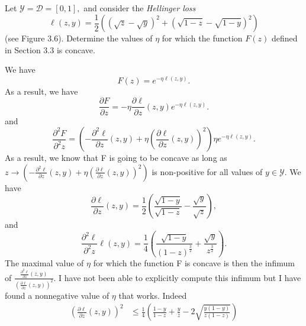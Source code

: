 \begin{exercise}[]{}
	Let $ \mathcal{Y} = \mathcal{D} = [0,1], $ and consider the \textit{Hellinger loss}
\begin{equation*}
	\ell(z,y) = \frac{1}{2} \left( (\sqrt{z}-\sqrt{y})^2 + (\sqrt{1-z}-\sqrt{1-y})^2 \right)
\end{equation*}
(see Figure 3.6). Determine the values of $ \eta $ for which the function $ F(z) $ defined in Section 3.3 is concave.
\end{exercise}

\begin{solution}[]
	We have 
\begin{equation*}
	F(z) = e^{-\eta\ell(z,y)}.
\end{equation*}
As a result, we have 
\begin{equation*}
	\frac{\partial F}{\partial z} = -\eta \frac{\partial \ell}{\partial z} (z,y) e^{-\eta \ell(z,y)}.
\end{equation*}
and
\begin{equation*}
	\frac{\partial ^2F}{\partial ^2z} = \left( -\frac{\partial ^2\ell}{\partial z} (z,y) + \eta \left(\frac{\partial \ell}{\partial z}(z,y) \right)^2 \right) \eta e^{-\eta\ell(z,y)} .
\end{equation*}
As a result, we know that F is going to be concave as long as $ z \rightarrow \left( -\frac{\partial ^2\ell}{\partial z} (z,y) + \eta \left(\frac{\partial \ell}{\partial z}(z,y) \right)^2 \right) $ is non-positive for all values of $ y\in \mathcal{Y} $. We have
\begin{equation*}
	\frac{\partial \ell}{\partial z} (z,y) = \frac{1}{2} \left( \frac{\sqrt{1-y}}{\sqrt{1-z}} - \frac{\sqrt{y}}{\sqrt{z}} \right),
\end{equation*}
and
\begin{equation*}
	\frac{\partial ^2\ell}{\partial ^2 z} \ell(z,y) = \frac{1}{4}\left( \frac{\sqrt{1-y}}{(1-z)^{\frac{3}{2}}} + \frac{\sqrt{y}}{z^{\frac{3}{2}}} \right).
\end{equation*}
The maximal value of $ \eta $ for which the function F is concave is then the infimum of $ \frac{\frac{\partial ^2\ell}{\partial z} (z,y)}{\left( \frac{\partial \ell}{\partial z} (z,y) \right)^2} $.
I have not been able to explicitly compute this infimum but I have found a nonnegative value of $ \eta $ that works. Indeed
\begin{align*}
	\left( \frac{\partial \ell}{\partial z}(z,y) \right)^2 &\leq \frac{1}{4}\left( \frac{1-y}{1-z} + \frac{y}{z} - 2 \sqrt{\frac{y(1-y)}{z(1-z)}} \right) \\

\end{align*}
\end{solution}
